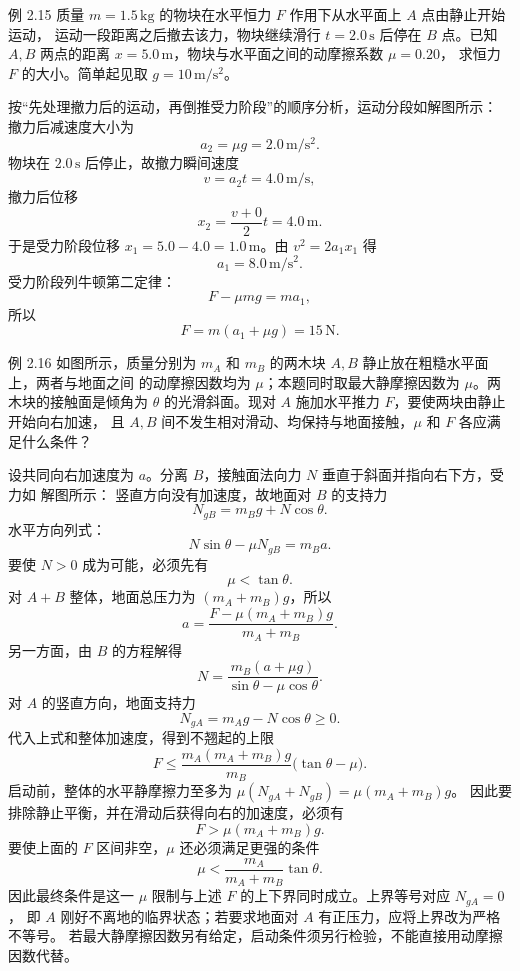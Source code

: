 \begin{origexamplebox}{例 2.15}
质量 $m=1.5\,\mathrm{kg}$ 的物块在水平恒力 $F$ 作用下从水平面上 $A$ 点由静止开始运动，
运动一段距离之后撤去该力，物块继续滑行 $t=2.0\,\mathrm s$ 后停在 $B$ 点。已知
$A,B$ 两点的距离 $x=5.0\,\mathrm m$，物块与水平面之间的动摩擦系数 $\mu=0.20$，
求恒力 $F$ 的大小。简单起见取 $g=10\,\mathrm{m/s^2}$。
\end{origexamplebox}

\begin{xesolution}
按“先处理撤力后的运动，再倒推受力阶段”的顺序分析，运动分段如解图所示：
\soldiagTwoFifteen
撤力后减速度大小为
\[
 a_2=\mu g=2.0\,\mathrm{m/s^2}.
\]
物块在 $2.0\,\mathrm s$ 后停止，故撤力瞬间速度
\[
 v=a_2t=4.0\,\mathrm{m/s},
\]
撤力后位移
\[
 x_2=\frac{v+0}{2}t=4.0\,\mathrm m.
\]
于是受力阶段位移 $x_1=5.0-4.0=1.0\,\mathrm m$。由 $v^2=2a_1x_1$ 得
\[
 a_1=8.0\,\mathrm{m/s^2}.
\]
受力阶段列牛顿第二定律：
\[
 F-\mu mg=ma_1,
\]
所以
\[
 \boxed{F=m(a_1+\mu g)=15\,\mathrm N}.
\]
\end{xesolution}

\begin{origexamplebox}{例 2.16}
如图所示，质量分别为 $m_A$ 和 $m_B$ 的两木块 $A,B$ 静止放在粗糙水平面上，两者与地面之间
的动摩擦因数均为 $\mu$；本题同时取最大静摩擦因数为 $\mu$。两木块的接触面是倾角为
$\theta$ 的光滑斜面。现对 $A$ 施加水平推力 $F$，要使两块由静止开始向右加速，
且 $A,B$ 间不发生相对滑动、均保持与地面接触，$\mu$ 和 $F$ 各应满足什么条件？
\probdiagTwoSixteen
\end{origexamplebox}

\begin{xesolution}
设共同向右加速度为 $a$。分离 $B$，接触面法向力 $N$ 垂直于斜面并指向右下方，受力如
解图所示：
\soldiagTwoSixteen
竖直方向没有加速度，故地面对 $B$ 的支持力
\[
 N_{gB}=m_Bg+N\cos\theta.
\]
水平方向列式：
\[
 N\sin\theta-\mu N_{gB}=m_Ba.
\]
要使 $N>0$ 成为可能，必须先有
\[
 \boxed{\mu<\tan\theta}.
\]
对 $A+B$ 整体，地面总压力为 $(m_A+m_B)g$，所以
\[
 a=\frac{F-\mu(m_A+m_B)g}{m_A+m_B}.
\]
另一方面，由 $B$ 的方程解得
\[
 N=\frac{m_B(a+\mu g)}{\sin\theta-\mu\cos\theta}.
\]
对 $A$ 的竖直方向，地面支持力
\[
 N_{gA}=m_Ag-N\cos\theta\ge0.
\]
代入上式和整体加速度，得到不翘起的上限
\[
 \boxed{F\le
 \frac{m_A(m_A+m_B)g}{m_B}\bigl(\tan\theta-\mu\bigr)}.
\]
启动前，整体的水平静摩擦力至多为 $\mu(N_{gA}+N_{gB})=\mu(m_A+m_B)g$。
因此要排除静止平衡，并在滑动后获得向右的加速度，必须有
\[
 \boxed{F>\mu(m_A+m_B)g}.
\]
要使上面的 $F$ 区间非空，$\mu$ 还必须满足更强的条件
\[
 \boxed{\mu<\frac{m_A}{m_A+m_B}\tan\theta}.
\]
因此最终条件是这一 $\mu$ 限制与上述 $F$ 的上下界同时成立。上界等号对应 $N_{gA}=0$，
即 $A$ 刚好不离地的临界状态；若要求地面对 $A$ 有正压力，应将上界改为严格不等号。
若最大静摩擦因数另有给定，启动条件须另行检验，不能直接用动摩擦因数代替。
\end{xesolution}

